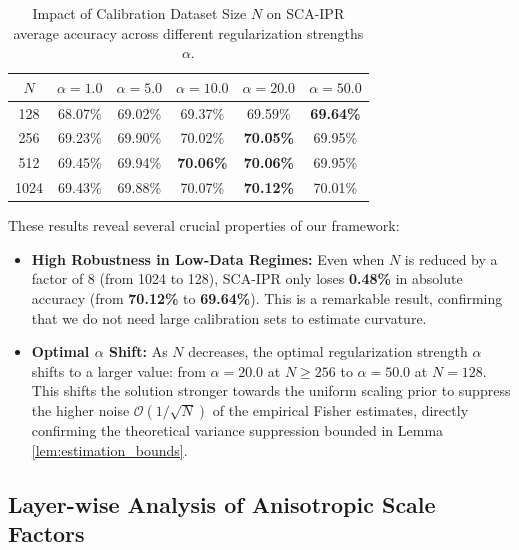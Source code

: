 \documentclass{article}
\theoremstyle{plain}
\theoremstyle{definition}
\theoremstyle{remark}
\begin{document}
\begin{table}[t]
\caption{Impact of Calibration Dataset Size $N$ on SCA-IPR average accuracy across different regularization strengths $\alpha$.}
\label{tab:calibration_ablation}
\vskip 0.15in
\begin{center}
\begin{small}
\begin{sc}
\begin{tabular}{cccccc}
\toprule
$N$ & $\alpha=1.0$ & $\alpha=5.0$ & $\alpha=10.0$ & $\alpha=20.0$ & $\alpha=50.0$ \\
\midrule
128 & 68.07\% & 69.02\% & 69.37\% & 69.59\% & \textbf{69.64\%} \\
256 & 69.23\% & 69.90\% & 70.02\% & \textbf{70.05\%} & 69.95\% \\
512 & 69.45\% & 69.94\% & \textbf{70.06\%} & \textbf{70.06\%} & 69.95\% \\
1024 & 69.43\% & 69.88\% & 70.07\% & \textbf{70.12\%} & 70.01\% \\
\bottomrule
\end{tabular}
\end{sc}
\end{small}
\end{center}
\vskip -0.1in
\end{table}

These results reveal several crucial properties of our framework:
\begin{itemize}
    \item \textbf{High Robustness in Low-Data Regimes:} Even when $N$ is reduced by a factor of 8 (from 1024 to 128), SCA-IPR only loses \textbf{0.48\%} in absolute accuracy (from \textbf{70.12\%} to \textbf{69.64\%}). This is a remarkable result, confirming that we do not need large calibration sets to estimate curvature.
    \item \textbf{Optimal $\alpha$ Shift:} As $N$ decreases, the optimal regularization strength $\alpha$ shifts to a larger value: from $\alpha = 20.0$ at $N \ge 256$ to $\alpha = 50.0$ at $N = 128$. This shifts the solution stronger towards the uniform scaling prior to suppress the higher noise $\mathcal{O}(1/\sqrt{N})$ of the empirical Fisher estimates, directly confirming the theoretical variance suppression bounded in Lemma \ref{lem:estimation_bounds}.
\end{itemize}

\subsection{Layer-wise Analysis of Anisotropic Scale Factors}
\label{subsec:layer_wise_analysis}
\end{document}
